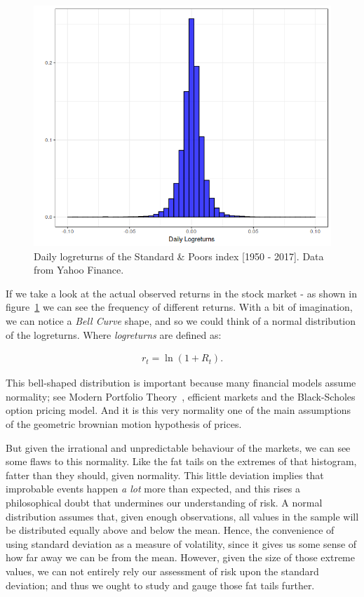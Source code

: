 \begin{figure}
    \centering
    \includegraphics[scale=0.65]{./images/sp_hist.png}
    \caption{Daily logreturns of the Standard \& Poors index [1950 - 2017]. Data from Yahoo Finance.}
    \label{fig:daily-logreturns-sp}
\end{figure}

If we take a look at the actual observed returns in the stock market - as shown in figure~\ref{fig:daily-logreturns-sp} we can see the frequency of different returns. With a bit of imagination, we can notice a \textit{Bell Curve} shape, and so we could  think of a normal distribution of the logreturns. Where \textit{logreturns} are defined as:

\begin{align} \label{eq:logreturn}
    r_t = \ln{(1+R_t)}\textit{.}
\end{align}

This bell-shaped distribution is important because many financial models assume normality; see Modern Portfolio Theory~\cite{a:markowitz-portfolio}, efficient markets and the Black-Scholes option pricing model. And it is this very normality one of the main assumptions of the geometric brownian motion hypothesis of prices.

But given the irrational and unpredictable behaviour of the markets, we can see some flaws to this normality. Like the fat tails on the extremes of that histogram, fatter than they should, given normality. This little deviation implies that improbable events happen \textit{a lot} more than expected, and this rises a philosophical doubt that undermines our understanding of risk. A normal distribution assumes that, given enough observations, all values in the sample will be distributed equally above and below the mean. Hence, the convenience of using standard deviation as a measure of volatility, since it gives us some sense of how far away we can be from the mean. However, given the size of those extreme values, we can not entirely rely our assessment of risk upon the standard deviation; and thus we ought to study and gauge those fat tails further.

